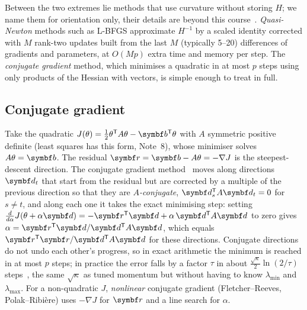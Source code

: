 \documentclass[11pt]{article}
\begin{document}
Between the two extremes lie methods that use curvature without storing $H$; we name them for orientation only,
their details are beyond this course~\cite{nocedal2006}. \emph{Quasi-Newton} methods such as L-BFGS approximate
$H^{-1}$ by a scaled identity corrected with $M$ rank-two updates built from the last $M$ (typically 5--20) differences
of gradients and parameters, at $O(Mp)$ extra time and memory per step. The \emph{conjugate gradient} method,
which minimises a quadratic in at most $p$ steps using only products of the Hessian with vectors, is simple enough to treat in full.

\subsection{Conjugate gradient}\label{sec:cg}

Take the quadratic $J(\theta) = \frac12\theta\T A\theta - \vect{b}\T\theta$ with $A$ symmetric positive definite (least
squares has this form, Note~8), whose minimiser solves $A\theta = \vect{b}$. The residual
$\vect{r} = \vect{b} - A\theta = -\nabla J$ is the steepest-descent direction. The conjugate gradient
method~\cite{hestenes1952} moves along directions $\vect{d}_t$ that start from the residual but are corrected by a
multiple of the previous direction so that they are \emph{$A$-conjugate}, $\vect{d}_s\T A\vect{d}_t = 0$ for $s \ne t$,
and along each one it takes the exact minimising step: setting $\frac{d}{d\alpha}J(\theta + \alpha\vect{d}) =
-\vect{r}\T\vect{d} + \alpha\,\vect{d}\T A\vect{d}$ to zero gives $\alpha = \vect{r}\T\vect{d}/\vect{d}\T A\vect{d}$, which
equals $\vect{r}\T\vect{r}/\vect{d}\T A\vect{d}$ for these directions. Conjugate directions do not undo each other's
progress, so in exact arithmetic the minimum is reached in at most $p$ steps; in practice the error falls by a factor
$\tau$ in about $\frac{\sqrt\kappa}{2}\ln(2/\tau)$ steps~\cite{nocedal2006}, the same $\sqrt\kappa$ as tuned momentum but
without having to know $\lambda_{\min}$ and $\lambda_{\max}$. For a non-quadratic $J$, \emph{nonlinear} conjugate
gradient (Fletcher--Reeves, Polak--Ribi\`ere) uses $-\nabla J$ for $\vect{r}$ and a line search for $\alpha$.
\end{document}
